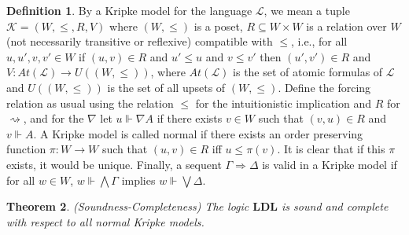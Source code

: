\documentclass[12pt,a4paper]{article}
\theoremstyle{plain}
\newtheorem{thm}{Theorem}[section]
\theoremstyle{definition}
\newtheorem{dfn}[thm]{Definition}
\begin{document}
\begin{dfn}
By a Kripke model for the language $\mathcal{L}$, we mean a tuple $\mathcal{K}=(W, \leq, R, V)$ where $(W, \leq)$ is a poset, $R \subseteq W \times W$ is a relation over $W$ (not necessarily transitive or reflexive) compatible with $\leq$, i.e., for all $u, u', v, v' \in W$ if $(u, v) \in R$ and $u' \leq u$ and $v \leq v'$ then $(u', v') \in R$ and $V: At(\mathcal{L}) \to U((W, \leq))$, where $At(\mathcal{L})$ is the set of atomic formulas of $\mathcal{L}$ and $U((W, \leq))$ is the set of all upsets of $(W, \leq)$. Define the forcing relation as usual using the relation $\leq$ for the intuitionistic implication and $R$ for $\rightsquigarrow$, and for the $\nabla$ let $u \Vdash \nabla A$ if there exists $v \in W$ such that $(v, u) \in R$ and $v \Vdash A$. A Kripke model is called normal if there exists an order preserving function $\pi : W \to W$ such that $(u, v) \in R$ iff $u \leq \pi(v)$. It is clear that if this $\pi$ exists, it would be unique. Finally, a sequent $\Gamma \Rightarrow \Delta$ is valid in a Kripke model if for all $w \in W$, $w \Vdash \bigwedge \Gamma$ implies $w \Vdash \bigvee \Delta$.
\end{dfn}

\begin{thm}(Soundness-Completeness) The logic $\mathbf{LDL}$ is sound and complete with respect to all normal Kripke models.
\end{thm}
\end{document}

